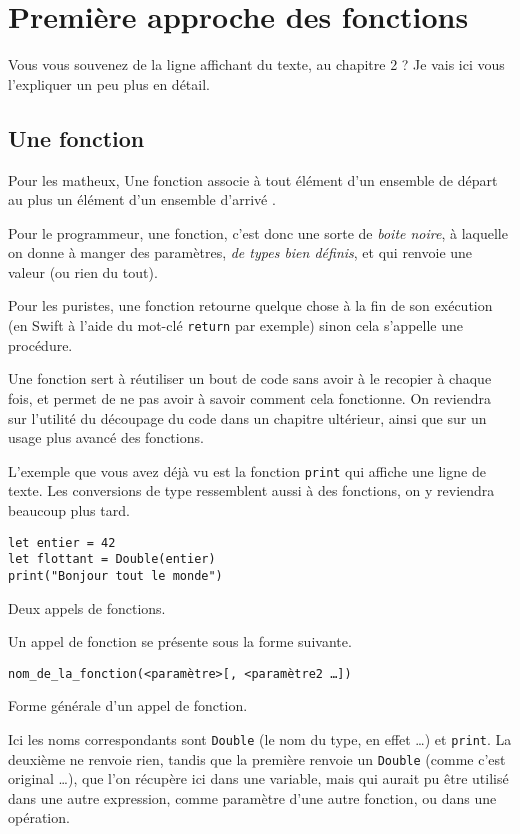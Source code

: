 \section{Première approche des fonctions}
Vous vous souvenez de la ligne affichant du texte, au chapitre 2 ? Je vais ici vous l'expliquer un peu plus en détail.
\subsection{Une fonction}
Pour les matheux, \og Une fonction associe à tout élément d'un ensemble de départ au plus un élément d'un ensemble d'arrivé \fg{}.

Pour le programmeur, une fonction, c'est donc une sorte de \emph{boite noire}, à laquelle on donne à manger des paramètres, \emph{de types bien définis}, et qui renvoie une valeur (ou rien du tout).

Pour les puristes, une fonction retourne quelque chose à la fin de son exécution (en Swift à l'aide du mot-clé \texttt{return} par exemple) sinon cela s'appelle une procédure.

Une fonction sert à réutiliser un bout de code sans avoir à le recopier à chaque fois, et permet de ne pas avoir à savoir comment cela fonctionne.
On reviendra sur l'utilité du découpage du code dans un chapitre ultérieur,
ainsi que sur un usage plus avancé des fonctions.

L'exemple que vous avez déjà vu est la fonction \texttt{print} qui affiche une ligne de texte. Les conversions de type ressemblent aussi à des fonctions, on y reviendra beaucoup plus tard.

\begin{listing}[h]
\begin{verbatim}
let entier = 42
let flottant = Double(entier)
print("Bonjour tout le monde")
\end{verbatim}
\caption{Deux appels de fonctions.}
\end{listing}

Un appel de fonction se présente sous la forme suivante.
\begin{listing}[h]
\begin{verbatim}
nom_de_la_fonction(<paramètre>[, <paramètre2 …]) 
\end{verbatim}
\caption{Forme générale d'un appel de fonction.}
\end{listing}

Ici les noms correspondants sont \texttt{Double} (le nom du type, en effet …) et \texttt{print}. La deuxième ne renvoie rien, tandis que la première renvoie un \texttt{Double} (comme c'est original …), que l'on récupère ici dans une variable, mais qui aurait pu être utilisé dans une autre expression, comme paramètre d'une autre fonction, ou dans une opération.

